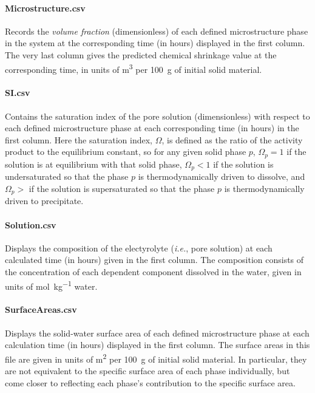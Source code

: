 \documentclass{article}
\newcommand{\us}{\underline{\phantom{X}}}
\begin{document}
{\paragraph{{\us}Microstructure.csv} Records the \textit{volume fraction}
(dimensionless) of each defined microstructure phase in the system
at the corresponding time (in hours) displayed in the first column.
The very last column gives the predicted chemical shrinkage value at the
corresponding time, in units of \unit{\meter\cubed} per \qty{100}{\gram}
of initial solid material.

\paragraph{{\us}SI.csv} Contains the saturation index of the pore solution
(dimensionless) with respect to each defined microstructure phase
at each corresponding time (in hours) in the first column. Here the saturation
index, $\Omega$, is defined as the ratio of the activity product to the equilibrium
constant, so for any given solid phase $p$, $\Omega_p = 1$ if the solution is at
equilibrium with that solid phase, $\Omega_p < 1$ if the solution is
undersaturated so that the phase $p$ is thermodynamically driven to dissolve,
and $\Omega_p >$ if the solution is
supersaturated so that the phase $p$ is thermodynamically driven to precipitate.

\paragraph{{\us}Solution.csv} Displays the composition of the electyrolyte
(\textit{i.e.}, pore solution) at each calculated time (in hours) given in
the first column. The composition consists of the concentration of each
dependent component dissolved in the water, given in units of
\unit{\mole\per\kilo\gram} water.

\paragraph{{\us}SurfaceAreas.csv} Displays the solid-water surface
area of each defined microstructure phase at each calculation time (in hours)
displayed in the first column. The surface areas in this file are given
in units of \unit{\meter\squared} per \qty{100}{\gram} of initial solid
material. In particular, they are not equivalent to the specific surface
area of each phase individually, but come closer to reflecting each phase's
contribution to the specific surface area.

}
\end{document}
